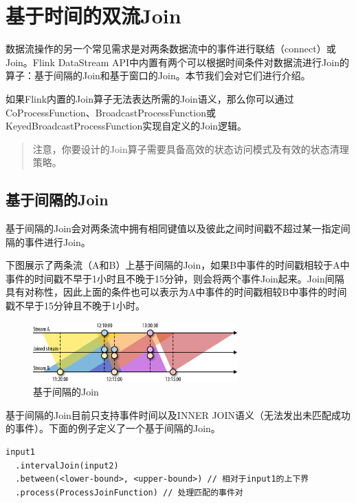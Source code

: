 \documentclass[cn,11pt,chinese]{elegantbook}
\begin{document}
\section{基于时间的双流Join}

数据流操作的另一个常见需求是对两条数据流中的事件进行联结（connect）或Join。Flink DataStream API中内置有两个可以根据时间条件对数据流进行Join的算子：基于间隔的Join和基于窗口的Join。本节我们会对它们进行介绍。

如果Flink内置的Join算子无法表达所需的Join语义，那么你可以通过CoProcessFunction、BroadcastProcessFunction或KeyedBroadcastProcessFunction实现自定义的Join逻辑。

\begin{quotation}
    注意，你要设计的Join算子需要具备高效的状态访问模式及有效的状态清理策略。
\end{quotation}

\subsection{基于间隔的Join}

基于间隔的Join会对两条流中拥有相同键值以及彼此之间时间戳不超过某一指定间隔的事件进行Join。

下图展示了两条流（A和B）上基于间隔的Join，如果B中事件的时间戳相较于A中事件的时间戳不早于1小时且不晚于15分钟，则会将两个事件Join起来。Join间隔具有对称性，因此上面的条件也可以表示为A中事件的时间戳相较B中事件的时间戳不早于15分钟且不晚于1小时。

\begin{figure}[htbp]
    \centering
    \includegraphics[width=0.7\textwidth]{images/spaf_0607.png}
    \caption{基于间隔的Join}
\end{figure}

基于间隔的Join目前只支持事件时间以及INNER JOIN语义（无法发出未匹配成功的事件）。下面的例子定义了一个基于间隔的Join。

\begin{verbatim}
input1
  .intervalJoin(input2)
  .between(<lower-bound>, <upper-bound>) // 相对于input1的上下界
  .process(ProcessJoinFunction) // 处理匹配的事件对
\end{verbatim}
\end{document}
